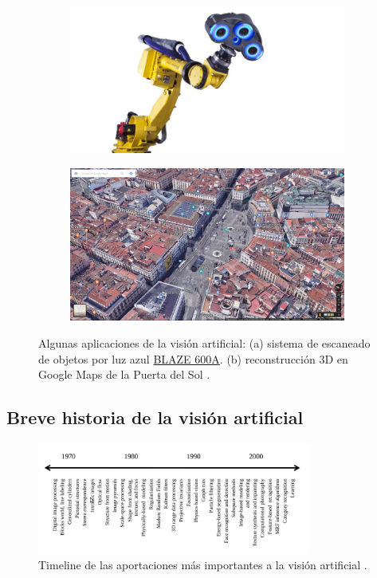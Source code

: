 \begin{figure}
  \begin{subfigure}{.5\textwidth}
    \centering
    \includegraphics[width=.9\linewidth]{images/camera.jpg}
    \caption { }
    \label{fig:apps1a}
  \end{subfigure}%
  \begin{subfigure}{.5\textwidth}
    \centering
    \includegraphics[width=.9\linewidth]{images/maps.jpg}
    \caption { }
    \label{fig:apps1b}
  \end{subfigure}
  \caption{Algunas aplicaciones de la visión artificial: (a) sistema de escaneado de objetos por luz azul \href{https://www.hexagonmi.com/es-ES/products/white-light-scanner-systems/blaze-600a}{BLAZE 600A}. (b) reconstrucción 3D en Google Maps de la Puerta del Sol \cite{tfg}. }
  \label{fig:applications}
\end{figure}

\subsection{Breve historia de la visión artificial}

\begin{figure}[H]
  \centering
  \includegraphics[width=0.8\textwidth]{images/timeline}
  \caption{Timeline de las aportaciones más importantes a la visión artificial \cite{tfg, book:szeliski}.}
\end{figure}

